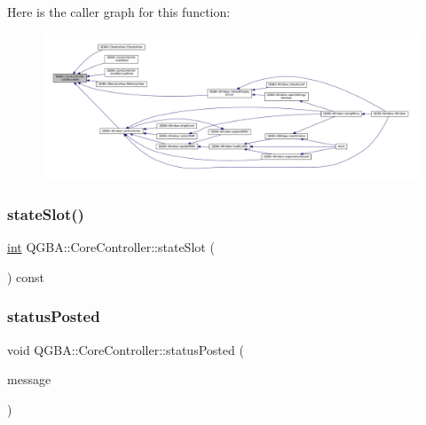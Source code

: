 Here is the caller graph for this function\+:
\nopagebreak
\begin{figure}[H]
\begin{center}
\leavevmode
\includegraphics[width=350pt]{class_q_g_b_a_1_1_core_controller_a560e2751dafab257f447f5560257ec22_icgraph}
\end{center}
\end{figure}
\mbox{\label{class_q_g_b_a_1_1_core_controller_acaf4e2229f8ea442f46adca7d313f2b5}} 
\subsubsection{\texorpdfstring{state\+Slot()}{stateSlot()}}
{\footnotesize\ttfamily \mbox{\hyperlink{ioapi_8h_a787fa3cf048117ba7123753c1e74fcd6}{int}} Q\+G\+B\+A\+::\+Core\+Controller\+::state\+Slot (\begin{DoxyParamCaption}{ }\end{DoxyParamCaption}) const\hspace{0.3cm}{\ttfamily [inline]}}

\mbox{\label{class_q_g_b_a_1_1_core_controller_a5f2f7c60e587d7a983654898d80802e0}} 
\subsubsection{\texorpdfstring{status\+Posted}{statusPosted}}
{\footnotesize\ttfamily void Q\+G\+B\+A\+::\+Core\+Controller\+::status\+Posted (\begin{DoxyParamCaption}\item[{const Q\+String \&}]{message }\end{DoxyParamCaption})\hspace{0.3cm}{\ttfamily [signal]}}

